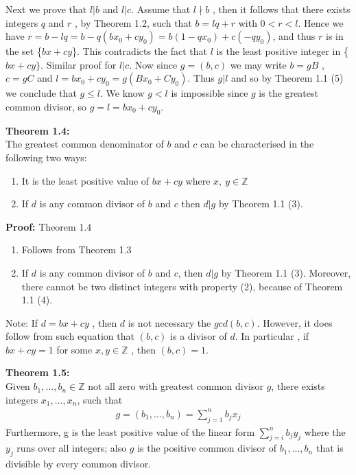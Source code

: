 \documentclass[a4paper]{article}
\begin{document}
Next we prove that $l|b$ and $l|c$. Assume that $l \nmid b$ , then it follows that there exists integers $q$ and $r$ , by Theorem 1.2, such that $b=lq+r$ with $0<r<l$. Hence we have $r=b-lq=b-q(bx_0+cy_0)=b(1-qx_0)+c(-qy_0)$, and thus $r$ is in the set \{$bx+cy$\}. This contradicts the fact that $l$ is the least positive integer in \{$bx+cy\}$. Similar proof for $l|c$. Now since $g=(b,c)$ we may write $b=gB$ , $c=gC$ and $l=bx_0+cy_0=g(Bx_0+Cy_0)$. Thus $g|l $ and so by Theorem 1.1 (5) we conclude that $g \leq l$. We know $g<l$ is impossible since $g$ is the greatest common divisor, so $g=l=bx_0+cy_0$.


\textbf{Theorem 1.4:}\\
The greatest common denominator of $b$ and $c$ can be characterised in the following two ways:
\begin{enumerate}
    \item It is the least positive value of $bx+cy$ where $x,\ y\in\mathbb{Z}$
    \item If $d$ is any common divisor of $b$ and $c$ then $d|g$ by Theorem 1.1 (3).
\end{enumerate}

\textbf{Proof:} Theorem 1.4

\begin{enumerate}
\item Follows from Theorem 1.3
\item If $d$ is any common divisor of $b$ and $c$, then $d|g$ by Theorem 1.1 (3). Moreover, there cannot be two distinct integers with property (2), because of Theorem 1.1 (4).
\end{enumerate}

Note: If $d=bx+cy$ , then $d$ is not necessary the $gcd(b,c)$. However, it does follow from such equation that $(b,c)$ is a divisor of $d$. In particular , if $bx+cy=1$ for some $x,y\in\mathbb{Z}$ , then $(b,c)=1$.

\textbf{Theorem 1.5:}\\
Given $b_1,...,b_n\in\mathbb{Z}$ not all zero with greatest common divisor $g$, there exists integers $x_1,...,x_n$,  such that
\begin{align}
    g=(b_1,...,b_n)=\sum^n_{j=1}b_jx_j
\end{align}
Furthermore, g is the least positive value of the linear form $\sum^n_{j=i}b_jy_j$ where the $y_j$ runs over all integers; also $g$ is the positive common divisor of $b_1,...,b_n$ that is divisible by every common divisor.
\end{document}
